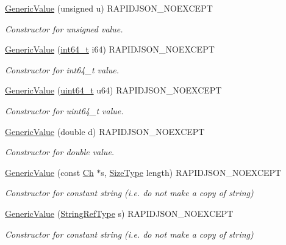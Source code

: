 \begin{DoxyCompactItemize}
\hyperlink{classGenericValue_a972bff6c56ac3d04622ff7fad8d98331}{Generic\+Value} (unsigned u) R\+A\+P\+I\+D\+J\+S\+O\+N\+\_\+\+N\+O\+E\+X\+C\+E\+PT
\begin{DoxyCompactList}\small\item\em Constructor for unsigned value. \end{DoxyCompactList}\item 
\hyperlink{classGenericValue_a964b69f1d2596f75ded5421b6db01a14}{Generic\+Value} (\hyperlink{stdint_8h_a414156feea104f8f75b4ed9e3121b2f6}{int64\+\_\+t} i64) R\+A\+P\+I\+D\+J\+S\+O\+N\+\_\+\+N\+O\+E\+X\+C\+E\+PT
\begin{DoxyCompactList}\small\item\em Constructor for int64\+\_\+t value. \end{DoxyCompactList}\item 
\hyperlink{classGenericValue_ad04805a57f5050c8e04be469ba64d6f3}{Generic\+Value} (\hyperlink{stdint_8h_aec6fcb673ff035718c238c8c9d544c47}{uint64\+\_\+t} u64) R\+A\+P\+I\+D\+J\+S\+O\+N\+\_\+\+N\+O\+E\+X\+C\+E\+PT
\begin{DoxyCompactList}\small\item\em Constructor for uint64\+\_\+t value. \end{DoxyCompactList}\item 
\hyperlink{classGenericValue_a267d05b7e98c3507908eaf085fe41155}{Generic\+Value} (double d) R\+A\+P\+I\+D\+J\+S\+O\+N\+\_\+\+N\+O\+E\+X\+C\+E\+PT
\begin{DoxyCompactList}\small\item\em Constructor for double value. \end{DoxyCompactList}\item 
\hyperlink{classGenericValue_a4d9af98141360cd801daab4ed1ca2c91}{Generic\+Value} (const \hyperlink{classGenericValue_ade0e0ce64ccd5d852da57a35e720bafb}{Ch} $\ast$s, \hyperlink{rapidjson_8h_a5ed6e6e67250fadbd041127e6386dcb5}{Size\+Type} length) R\+A\+P\+I\+D\+J\+S\+O\+N\+\_\+\+N\+O\+E\+X\+C\+E\+PT
\begin{DoxyCompactList}\small\item\em Constructor for constant string (i.\+e. do not make a copy of string) \end{DoxyCompactList}\item 
\hyperlink{classGenericValue_abb2887958974fef1b2b5c8e32cc72ddb}{Generic\+Value} (\hyperlink{classGenericValue_a32e0f30ee278072374c8168b14d3317f}{String\+Ref\+Type} s) R\+A\+P\+I\+D\+J\+S\+O\+N\+\_\+\+N\+O\+E\+X\+C\+E\+PT
\begin{DoxyCompactList}\small\item\em Constructor for constant string (i.\+e. do not make a copy of string) \end{DoxyCompactList}\item 

\end{DoxyCompactItemize}
